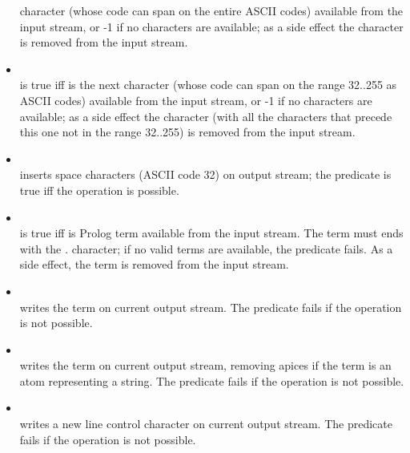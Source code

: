 \begin{itemize}
character (whose code can span on the entire ASCII codes)
available from the input stream, or -1 if no characters are
available;
%
as a side effect the character is removed from the input stream.\\
%
%
\item {}\\
\noindent{} is true iff  is the next
character (whose code can span on the range 32..255 as ASCII
codes) available from the input stream, or -1 if no characters are
available;
%
as a side effect the character (with all the characters that
precede this one not in the range 32..255) is removed from the
input stream.\\
%
%
\item {}\\
\noindent{} inserts  space
characters (ASCII code 32) on output stream; the predicate is true
iff the operation is possible.\\
%
%
%
\item {}\\
\noindent{} is true iff  is Prolog term
available from the input stream.
%
The term must ends with the \emph{.} character; if no valid terms
are available, the predicate fails.
%
As a side effect, the term is removed from the input stream.\\
%
%
%
\item {}\\
\noindent{} writes the term  on current
output stream.
%
The predicate fails if the operation is not possible.\\
%
%
%
\item {}\\
\noindent{} writes the term  on current
output stream, removing apices if the term is an atom representing
a string.
%
The predicate fails if the operation is not possible.\\
%
%
\item {}\\
\noindent{} writes a new line control character on current
output stream.
%
The predicate fails if the operation is not possible.\\
%
\end{itemize}


